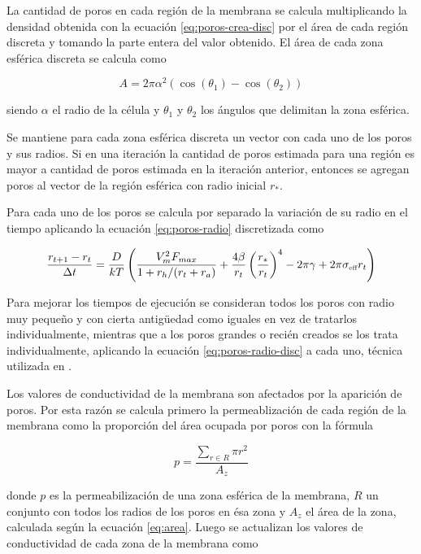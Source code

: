 La cantidad de poros en cada región de la membrana se calcula multiplicando la densidad obtenida con la ecuación \ref{eq:poros-crea-disc} por el área de cada región discreta y tomando la parte entera del valor obtenido. El área de cada zona esférica discreta se calcula como 

\begin{equation} \label{eq:area}
	A = 2 \pi \alpha^2 (\cos(\theta_1) - \cos(\theta_2))
\end{equation}

siendo $\alpha$ el radio de la célula y $\theta_1$ y $\theta_2$ los ángulos que delimitan la zona esférica.

Se mantiene para cada zona esférica discreta un vector con cada uno de los poros y sus radios. Si en una iteración la cantidad de poros estimada para una región es mayor a cantidad de poros estimada en la iteración anterior, entonces se agregan poros al vector de la región esférica con radio inicial $r_*$.

Para cada uno de los poros se calcula por separado la variación de su radio en el tiempo aplicando la ecuación \ref{eq:poros-radio} discretizada como

\begin{equation} \label{eq:poros-radio-disc}
	\frac{r_{t+1} - r_t}{\Delta t} = \frac{D}{kT} \left( \frac{V_m^2 F_{max}}{1+r_h / (r_t+r_a)} + \frac{4 \beta}{r_t} \left(\frac{r_*}{r_t}\right)^4 - 2 \pi \gamma + 2 \pi \sigma_{\textrm{\tiny eff}} r_t \right)
\end{equation}

Para mejorar los tiempos de ejecución se consideran todos los poros con radio muy pequeño y con cierta antigüedad como iguales en vez de tratarlos individualmente, mientras que a los poros grandes o recién creados se los trata individualmente, aplicando la ecuación \ref{eq:poros-radio-disc} a cada uno, técnica utilizada en \cite{krass07}.

Los valores de conductividad de la membrana son afectados por la aparición de poros. Por esta razón se calcula primero la permeablización de cada región de la membrana como la proporción del área ocupada por poros con la fórmula

\begin{equation} 
    p = \frac{ \sum\limits_{r \in R} \pi r^2 }{A_z}
\end{equation} 

donde $p$ es la permeabilización de una zona esférica de la membrana, $R$ un conjunto con todos los radios de los poros en ésa zona y $A_z$ el área de la zona, calculada según la ecuación \ref{eq:area}. Luego se actualizan los valores de conductividad de cada zona de la membrana como

